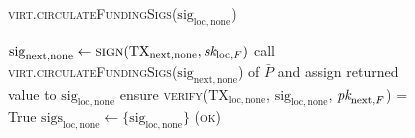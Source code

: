 \begin{figure}[H]
\begin{processbox}{\textsc{virt.circulateFundingSigs}($\mathrm{sig}_{\mathrm{loc},
  \mathrm{none}}$)}
\begin{algorithmic}[1]
      \Else \: 
        \State $\mathrm{sig}_{\mathrm{next}, \mathrm{none}} \gets
        \textsc{sign}(\mathrm{TX}_{\mathrm{next}, \mathrm{none}},
        \textit{sk}_{\mathrm{loc}, F})$
        \State call
        \textsc{virt.circulateFundingSigs}($\mathrm{sig}_{\mathrm{next},
        \mathrm{none}}$) of $\bar{P}$ and assign returned value to
        $\mathrm{sig}_{\mathrm{loc}, \mathrm{none}}$
        \State ensure \textsc{verify}($\mathrm{TX}_{\mathrm{loc},
        \mathrm{none}}$, $\mathrm{sig}_{\mathrm{loc}, \mathrm{none}}$,
        $\textit{pk}_{\mathrm{next}, F}$) = True 
        \State $\mathrm{sigs}_{\mathrm{loc}, \mathrm{none}} \gets \{
        \mathrm{sig}_{\mathrm{loc}, \mathrm{none}} \}$
        \State \Return (\textsc{ok})
      \EndIf
    \end{algorithmic}
  \end{processbox}
  \caption{}
  \label{code:virtual-layer:funding-sigs}
\end{figure}

